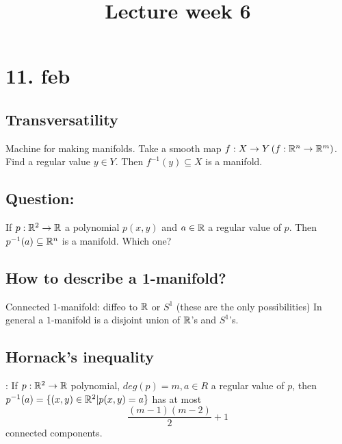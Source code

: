 \title{Lecture week 6}
\maketitle
\section{11. feb}
\subsection*{Transversatility}
Machine for making manifolds.
\newline Take a smooth map $f: X \to Y \left(f:\mathbb{R}^n \to \mathbb{R}^m\right)$.
\newline Find a regular value $y\in Y$. Then $f ^{-1}(y) \subseteq X $ is a manifold.

\subsection*{Question:}
If $p: \mathbb{R}^2 \to \mathbb{R}$ a polynomial $p(x,y)$ and $a\in \mathbb{R}$ a regular value of $p$. Then $p ^{-1}(a) \subseteq \mathbb{R}^n $ is a manifold. Which one?

\subsection*{How to describe a 1-manifold?}
Connected $1$-manifold: diffeo to $\mathbb{R}$ or $S^1$ (these are the only possibilities)
\newline In general a $1$-manifold is a disjoint union of $\mathbb{R}$'s and $S^1$'s.

\subsection*{Hornack's inequality}:
If $p: \mathbb{R}^2 \to \mathbb{R}$ polynomial, $deg(p)=m, a\in R$ a regular value of $p$, then $p ^{-1}(a)=\{(x,y)\in \mathbb{R}^2 | p(x,y)=a\}$ has at most
  $$\frac{(m-1)(m-2)}{2}+1$$
connected components.

